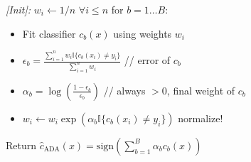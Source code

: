 \begin{highlightbox}
    \textit{\scriptsize [Init]:} $w_i \leftarrow 1/n$ $\forall i \leq n$
    for $b = 1 \ldots B$:
    \begin{itemize}[leftmargin=25pt]
        \item[\textit{\scriptsize [Train]:}]
            Fit classifier $c_b(x)$ using weights $w_i$
        \item[\textit{\scriptsize [Eval]:}]
            $\epsilon_b = \frac{\sum_{i=1}^n w_i \mathbb{I}\{c_b(x_i) \neq y_i\}}{\sum_{i=1}^n w_i}$ // error of $c_b$
        \item[\textit{\scriptsize [Update]:}]
            $\alpha_b = \log(\frac{1-\epsilon_b}{\epsilon_b})$ // always $>0$, final weight of $c_b$
        \vspace{-2pt}
        \item[\textit{\scriptsize [Reweight]:}]
            $w_i \leftarrow w_i \exp(\alpha_b \mathbb{I}\{c_b(x_i) \neq y_i\})$ normalize!
    \end{itemize}
    Return $\hat{c}_{\text{ADA}}(x) = \text{sign}(\sum_{b=1}^B \alpha_b c_b(x))$
\end{highlightbox}

